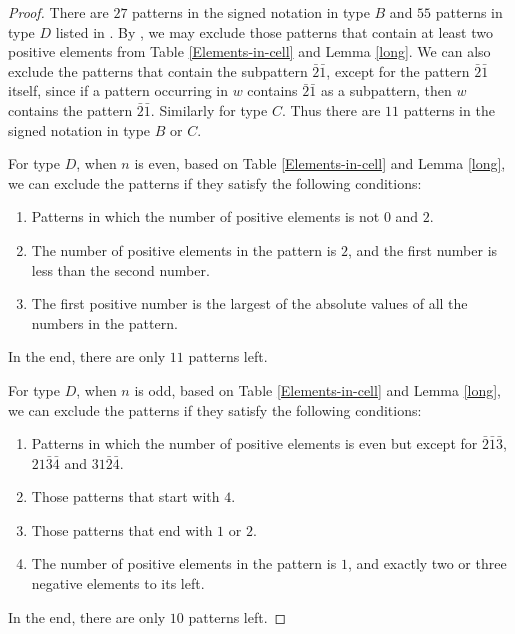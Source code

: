\documentclass[11pt, reqno]{amsart}
\theoremstyle{definition}
\numberwithin{equation}{section}
\begin{document}
\begin{proof}
    There are $27$ patterns in the signed notation in type $B$ and $55$ patterns in type $D$ listed in \cite{Bi-98}. By \cite[Thm. 4.2 and Thm. 6.1]{Bi-98}, we may exclude those patterns that contain at least two positive elements  from Table \ref{Elements-in-cell} and Lemma \ref{long}. We can also exclude the patterns that contain the subpattern $\bar{2}\bar{1}$, except for the pattern $\bar{2}\bar{1}$ itself, since if a pattern occurring in $w$ contains $\bar{2}\bar{1}$ as a subpattern, then $w$ contains the pattern $\bar{2}\bar{1}$. 
    Similarly for type $C$. Thus there are $11$ patterns in the signed notation in type $B$ or $C$.

    For type $D$, when $n$ is even, based on Table \ref{Elements-in-cell} and Lemma \ref{long}, we can exclude the patterns if they satisfy the following conditions:
    \begin{enumerate}
        \item Patterns in which the number of positive elements is not $0$ and $2$.

        \item The number of positive elements in the pattern is $2$, and the first number is less than the second number.

       \item The first positive number is the largest of the absolute values of all the numbers in the pattern.

    \end{enumerate}
In the end, there are only $11$ patterns left.    

For type $D$, when $n$ is odd, based on Table \ref{Elements-in-cell} and Lemma \ref{long}, we can exclude the patterns if they satisfy the following conditions:
  \begin{enumerate}
        \item Patterns in which the number of positive elements is even but except for $\bar{2}\bar{1}\bar{3}$, $21\bar{3}\bar{4}$ and $31\bar{2}\bar{4}$.

        \item Those patterns that start with $4$.

        \item Those patterns that end with $1$ or $2$.

        \item The number of positive elements in the pattern is $1$, and exactly two or three negative elements to its left.

    \end{enumerate}
In the end, there are only $10$ patterns left.    


     
\end{proof}
\end{document}
